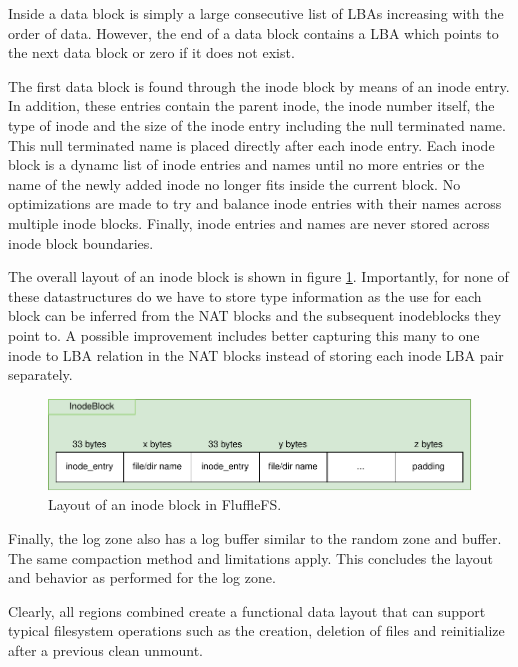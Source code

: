 Inside a data block is simply a large consecutive list of LBAs increasing
with the order of data. However, the end of a data block contains a LBA which
points to the next data block or zero if it does not exist.

The first data block is found through the inode block by means of an inode
entry. In addition, these entries contain the parent inode, the inode number
itself, the type of inode and the size of the inode entry including the null
terminated name. This null terminated name is placed directly after each
inode entry. Each inode block is a dynamc list of inode entries and names
until no more entries or the name of the newly added inode no longer fits
inside the current block. No optimizations are made to try and balance inode
entries with their names across multiple inode blocks. Finally, inode entries
and names are never stored across inode block boundaries.

The overall layout of an inode block is shown in figure
\ref{figure:fluffleinodeblock}. Importantly, for none of these datastructures
do we have to store type information as the use for each block can be inferred
from the NAT blocks and the subsequent inodeblocks they point to.
A possible improvement includes better capturing this many to one inode to LBA
relation in the NAT blocks instead of storing each inode LBA pair separately.

\begin{figure}[h!]
    \centering
	\includegraphics[width=1\textwidth]{resources/images/fluffle-inodeblock.pdf}
	\caption{Layout of an inode block in FluffleFS.}
    \label{figure:fluffleinodeblock}
\end{figure}

Finally, the log zone also has a log buffer similar to the random zone and
buffer. The same compaction method and limitations apply. This concludes the
layout and behavior as performed for the log zone.

Clearly, all regions combined create a functional data layout that can support
typical filesystem operations such as the creation, deletion of files and
reinitialize after a previous clean unmount.

